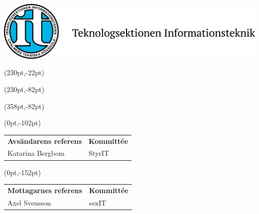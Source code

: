 \documentclass[a4paper,11pt]{article}
\begin{document}
\pagestyle{fancy}
\fancyhf{} %
\renewcommand{\headrulewidth}{0pt}
\renewcommand{\footrulewidth}{0pt}

\setlength{\fboxsep}{1.5em}
\setlength{\parindent}{0pt}

{\includegraphics[height=3\baselineskip]{sektionslogo.png}}



\fancyput*(230pt,-22pt){}

\fancyput*(230pt,-82pt){}

\fancyput*(358pt,-82pt){}

\vspace{3em}

\fancyput*(0pt,-102pt){
    \begin{minipage}{85pt}
      \begin{tabular}{ll}
        \textbf{Avsändarens referens} & \textbf{Kommittée}\\
         Katarina Bergbom & StyrIT \\
      \end{tabular}
    \end{minipage}}
    

\fancyput*(0pt,-152pt){
    \begin{minipage}{85pt}
      \begin{tabular}{ll}
        \textbf{Mottagarnes referens} &  \textbf{Kommittée}\\
        Axel Svensson & sexIT \\
      \end{tabular}
    \end{minipage}}
\end{document}
